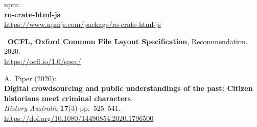 \begin{thebibliography}{9}
npm:\\
\textbf{ro-crate-html-js}\\
\url{https://www.npmjs.com/package/ro-crate-html-js}

~\textbf{OCFL, Oxford Common File Layout Specification},
Recommendation, 2020.\\
\url{https://ocfl.io/1.0/spec/}

A.~Piper (2020):\\
\textbf{Digital crowdsourcing and public understandings of the past:
Citizen historians meet criminal characters}.\\
\emph{History Australia} \textbf{17}(3) pp.~525--541.\\
\url{https://doi.org/10.1080/14490854.2020.1796500}



\end{thebibliography}
